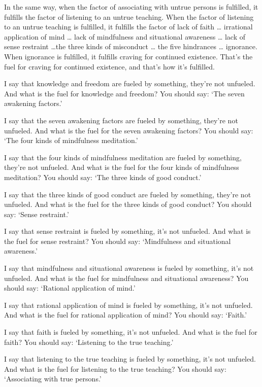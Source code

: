 \documentclass[12pt,openany]{book}%
\begin{document}
In the same way, when the factor of associating with untrue persons is fulfilled, it fulfills the factor of listening to an untrue teaching. When the factor of listening to an untrue teaching is fulfilled, it fulfills the factor of lack of faith … irrational application of mind … lack of mindfulness and situational awareness … lack of sense restraint …the three kinds of misconduct … the five hindrances … ignorance. When ignorance is fulfilled, it fulfills craving for continued existence. That’s the fuel for craving for continued existence, and that’s how it’s fulfilled. 

I say that knowledge and freedom are fueled by something, they’re not unfueled. And what is the fuel for knowledge and freedom? You should say: ‘The seven awakening factors.’ 

I say that the seven awakening factors are fueled by something, they’re not unfueled. And what is the fuel for the seven awakening factors? You should say: ‘The four kinds of mindfulness meditation.’ 

I say that the four kinds of mindfulness meditation are fueled by something, they’re not unfueled. And what is the fuel for the four kinds of mindfulness meditation? You should say: ‘The three kinds of good conduct.’ 

I say that the three kinds of good conduct are fueled by something, they’re not unfueled. And what is the fuel for the three kinds of good conduct? You should say: ‘Sense restraint.’ 

I say that sense restraint is fueled by something, it’s not unfueled. And what is the fuel for sense restraint? You should say: ‘Mindfulness and situational awareness.’ 

I say that mindfulness and situational awareness is fueled by something, it’s not unfueled. And what is the fuel for mindfulness and situational awareness? You should say: ‘Rational application of mind.’ 

I say that rational application of mind is fueled by something, it’s not unfueled. And what is the fuel for rational application of mind? You should say: ‘Faith.’ 

I say that faith is fueled by something, it’s not unfueled. And what is the fuel for faith? You should say: ‘Listening to the true teaching.’ 

I say that listening to the true teaching is fueled by something, it’s not unfueled. And what is the fuel for listening to the true teaching? You should say: ‘Associating with true persons.’ 
\end{document}
